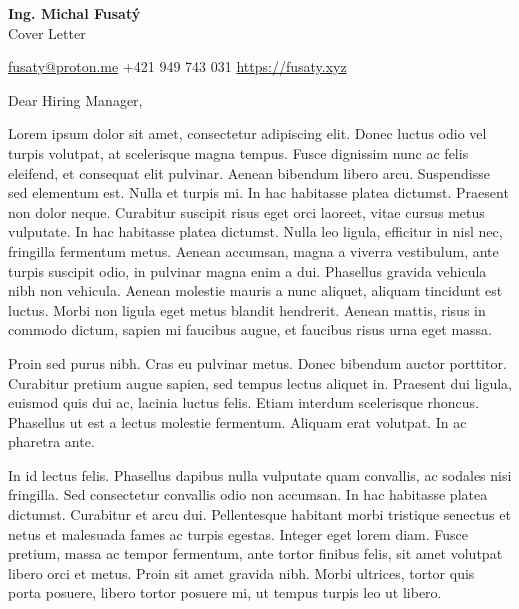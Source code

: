 \documentclass[12pt]{article}
\begin{document}

\begin{center}
	{\Large \bfseries Ing. Michal Fusatý} \\ 
	{\large Cover Letter} 	
\end{center}

\vspace{0.5em}

\begin{center}
    \noindent
    \href{mailto:fusaty@proton.me}{fusaty@proton.me}   \hfill \faAngleLeft \hfill
    +421 949 743 031 \hfill \faAngleRight \hfill
    \href{https://fusaty.xyz}{https://fusaty.xyz} \hfill
\end{center}


\vspace{1em} %

\noindent
Dear Hiring Manager,

Lorem ipsum dolor sit amet, consectetur adipiscing elit. Donec luctus odio vel turpis volutpat, at scelerisque magna tempus. Fusce dignissim nunc ac felis eleifend, et consequat elit pulvinar. Aenean bibendum libero arcu. Suspendisse sed elementum est. Nulla et turpis mi. In hac habitasse platea dictumst. Praesent non dolor neque. Curabitur suscipit risus eget orci laoreet, vitae cursus metus vulputate. In hac habitasse platea dictumst. Nulla leo ligula, efficitur in nisl nec, fringilla fermentum metus. Aenean accumsan, magna a viverra vestibulum, ante turpis suscipit odio, in pulvinar magna enim a dui. Phasellus gravida vehicula nibh non vehicula. Aenean molestie mauris a nunc aliquet, aliquam tincidunt est luctus. Morbi non ligula eget metus blandit hendrerit. Aenean mattis, risus in commodo dictum, sapien mi faucibus augue, et faucibus risus urna eget massa.

Proin sed purus nibh. Cras eu pulvinar metus. Donec bibendum auctor porttitor. Curabitur pretium augue sapien, sed tempus lectus aliquet in. Praesent dui ligula, euismod quis dui ac, lacinia luctus felis. Etiam interdum scelerisque rhoncus. Phasellus ut est a lectus molestie fermentum. Aliquam erat volutpat. In ac pharetra ante.

In id lectus felis. Phasellus dapibus nulla vulputate quam convallis, ac sodales nisi fringilla. Sed consectetur convallis odio non accumsan. In hac habitasse platea dictumst. Curabitur et arcu dui. Pellentesque habitant morbi tristique senectus et netus et malesuada fames ac turpis egestas. Integer eget lorem diam. Fusce pretium, massa ac tempor fermentum, ante tortor finibus felis, sit amet volutpat libero orci et metus. Proin sit amet gravida nibh. Morbi ultrices, tortor quis porta posuere, libero tortor posuere mi, ut tempus turpis leo ut libero.
\end{document}
